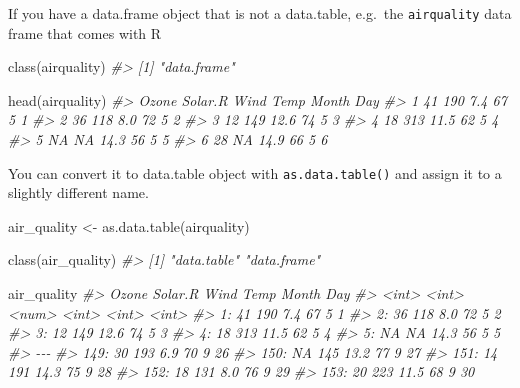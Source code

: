 \documentclass[
]{book}
\newenvironment{Shaded}{\begin{snugshade}}{\end{snugshade}}
\newcommand{\CommentTok}[1]{\textcolor[rgb]{0.56,0.35,0.01}{\textit{#1}}}
\newcommand{\FunctionTok}[1]{\textcolor[rgb]{0.00,0.00,0.00}{#1}}
\newcommand{\NormalTok}[1]{#1}
\newcommand{\OtherTok}[1]{\textcolor[rgb]{0.56,0.35,0.01}{#1}}
\begin{document}
If you have a data.frame object that is not a data.table, e.g.~the \texttt{airquality} data frame that comes with R

\begin{Shaded}
\begin{Highlighting}[]
\FunctionTok{class}\NormalTok{(airquality)}
\CommentTok{\#\textgreater{} [1] "data.frame"}

\FunctionTok{head}\NormalTok{(airquality)}
\CommentTok{\#\textgreater{}   Ozone Solar.R Wind Temp Month Day}
\CommentTok{\#\textgreater{} 1    41     190  7.4   67     5   1}
\CommentTok{\#\textgreater{} 2    36     118  8.0   72     5   2}
\CommentTok{\#\textgreater{} 3    12     149 12.6   74     5   3}
\CommentTok{\#\textgreater{} 4    18     313 11.5   62     5   4}
\CommentTok{\#\textgreater{} 5    NA      NA 14.3   56     5   5}
\CommentTok{\#\textgreater{} 6    28      NA 14.9   66     5   6}
\end{Highlighting}
\end{Shaded}

You can convert it to data.table object with \texttt{as.data.table()} and assign it to a slightly different name.

\begin{Shaded}
\begin{Highlighting}[]
\NormalTok{air\_quality }\OtherTok{\textless{}{-}} \FunctionTok{as.data.table}\NormalTok{(airquality)}

\FunctionTok{class}\NormalTok{(air\_quality)}
\CommentTok{\#\textgreater{} [1] "data.table" "data.frame"}

\NormalTok{air\_quality}
\CommentTok{\#\textgreater{}      Ozone Solar.R  Wind  Temp Month   Day}
\CommentTok{\#\textgreater{}      \textless{}int\textgreater{}   \textless{}int\textgreater{} \textless{}num\textgreater{} \textless{}int\textgreater{} \textless{}int\textgreater{} \textless{}int\textgreater{}}
\CommentTok{\#\textgreater{}   1:    41     190   7.4    67     5     1}
\CommentTok{\#\textgreater{}   2:    36     118   8.0    72     5     2}
\CommentTok{\#\textgreater{}   3:    12     149  12.6    74     5     3}
\CommentTok{\#\textgreater{}   4:    18     313  11.5    62     5     4}
\CommentTok{\#\textgreater{}   5:    NA      NA  14.3    56     5     5}
\CommentTok{\#\textgreater{}  {-}{-}{-}                                      }
\CommentTok{\#\textgreater{} 149:    30     193   6.9    70     9    26}
\CommentTok{\#\textgreater{} 150:    NA     145  13.2    77     9    27}
\CommentTok{\#\textgreater{} 151:    14     191  14.3    75     9    28}
\CommentTok{\#\textgreater{} 152:    18     131   8.0    76     9    29}
\CommentTok{\#\textgreater{} 153:    20     223  11.5    68     9    30}
\end{Highlighting}
\end{Shaded}
\end{document}
